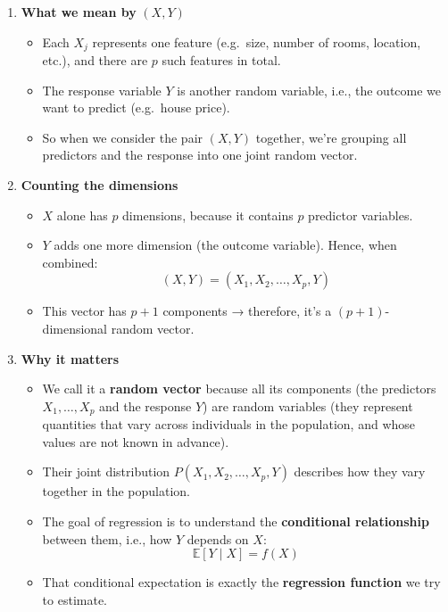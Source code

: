 \documentclass[
  letterpaper,
  DIV=11,
  numbers=noendperiod]{scrartcl}
\providecommand{\tightlist}{%
  \setlength{\itemsep}{0pt}\setlength{\parskip}{0pt}}\usepackage{longtable,booktabs,array}
\begin{document}
\begin{enumerate}
\def\labelenumi{\arabic{enumi}.}
\item
  \textbf{What we mean by} \((X, Y)\)

  \begin{itemize}
  \tightlist
  \item
    Each \(X_j\) represents one feature (e.g.~size, number of rooms,
    location, etc.), and there are \(p\) such features in total.
  \item
    The response variable \(Y\) is another random variable, i.e., the
    outcome we want to predict (e.g.~house price).
  \item
    So when we consider the pair \((X, Y)\) together, we're grouping all
    predictors and the response into one joint random vector.
  \end{itemize}
\item
  \textbf{Counting the dimensions}

  \begin{itemize}
  \tightlist
  \item
    \(X\) alone has \(p\) dimensions, because it contains \(p\)
    predictor variables.
  \item
    \(Y\) adds one more dimension (the outcome variable). Hence, when
    combined: \[ (X, Y) = (X_1, X_2, \dots, X_p, Y) \]
  \item
    This vector has \(p + 1\) components → therefore, it's a
    \((p + 1)\)-dimensional random vector.
  \end{itemize}
\item
  \textbf{Why it matters}

  \begin{itemize}
  \item
    We call it a \textbf{random vector} because all its components (the
    predictors \(X_1, \ldots, X_p\) and the response \(Y\)) are random
    variables (they represent quantities that vary across individuals in
    the population, and whose values are not known in advance).
  \item
    Their joint distribution \(P(X_1, X_2, \dots, X_p, Y)\) describes
    how they vary together in the population.
  \item
    The goal of regression is to understand the \textbf{conditional
    relationship} between them, i.e., how \(Y\) depends on \(X\):
    \[ \mathbb{E}[Y \mid X] = f(X) \]
  \item
    That conditional expectation is exactly the \textbf{regression
    function} we try to estimate.
  \end{itemize}
\end{enumerate}
\end{document}
